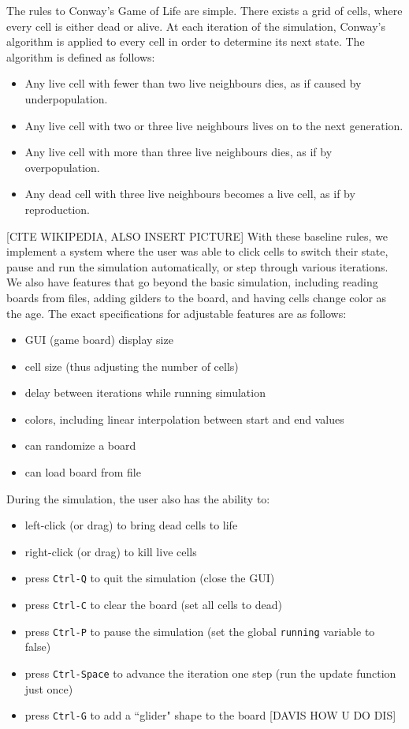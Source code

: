 \documentclass[12pt]{article}
\newcommand{\mybegit}{\vspace{-2mm} \begin{itemize} \itemsep-.6em }
\begin{document}
\newpage
	The rules to Conway's Game of Life are simple. There exists a grid of cells, where every cell is either dead or alive. At each iteration of the simulation, Conway's algorithm is applied to every cell in order to determine its next state. The algorithm is defined as follows:
	\mybegit\vspace{-4mm}
		\item Any live cell with fewer than two live neighbours dies, as if caused by underpopulation.
		\item Any live cell with two or three live neighbours lives on to the next generation.
		\item Any live cell with more than three live neighbours dies, as if by overpopulation.
		\item Any dead cell with three live neighbours becomes a live cell, as if by reproduction.
	\end{itemize} 
	[CITE WIKIPEDIA, ALSO INSERT PICTURE] With these baseline rules, we implement a system where the user was able to click cells to switch their state, pause and run the simulation automatically, or step through various iterations. We also have features that go beyond the basic simulation, including reading boards from files, adding gilders to the board, and having cells change color as the age. The exact specifications for adjustable features are as follows:
	\mybegit
		\item GUI (game board) display size
		\item cell size (thus adjusting the number of cells) 
		\item delay between iterations while running simulation
		\item colors, including linear interpolation between start and end values
		\item can randomize a board
		\item can load board from file
	\end{itemize} 
	 During the simulation, the user also has the ability to: 
	\mybegit
		\item left-click (or drag) to bring dead cells to life
		\item right-click (or drag) to kill live cells
		\item press \texttt{Ctrl-Q} to quit the simulation (close the GUI) 
		\item press \texttt{Ctrl-C} to clear the board (set all cells to dead) 
		\item press \texttt{Ctrl-P} to pause the simulation (set the global \texttt{running} variable to false)
		\item press \texttt{Ctrl-Space} to advance the iteration one step (run the update function just once)
		\item press \texttt{Ctrl-G} to add a ``glider" shape to the board [DAVIS HOW U DO DIS]
	\end{itemize} 
	
\end{document}
